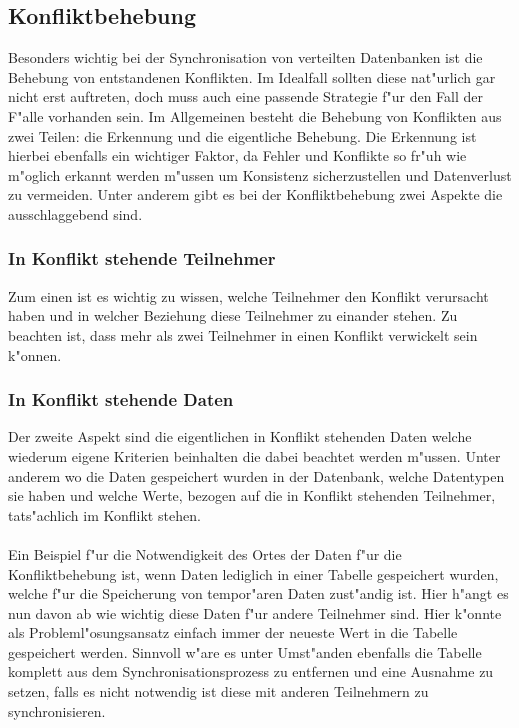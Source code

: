 \documentclass[a4paper,14pt]{scrreprt}
\begin{document}
\subsection{Konfliktbehebung}
Besonders wichtig bei der Synchronisation von verteilten Datenbanken ist die Behebung von entstandenen Konflikten. Im Idealfall sollten diese nat"urlich gar nicht erst auftreten, doch muss auch eine passende Strategie f"ur den Fall der F"alle vorhanden sein. Im Allgemeinen besteht die Behebung von Konflikten aus zwei Teilen: die Erkennung und die eigentliche Behebung. Die Erkennung ist hierbei ebenfalls ein wichtiger Faktor, da Fehler und Konflikte so fr"uh wie m"oglich erkannt werden m"ussen um Konsistenz sicherzustellen und Datenverlust zu vermeiden. Unter anderem gibt es bei der Konfliktbehebung zwei Aspekte die ausschlaggebend sind.
\subsubsection{In Konflikt stehende Teilnehmer}
Zum einen ist es wichtig zu wissen, welche Teilnehmer den Konflikt verursacht haben und in welcher Beziehung diese Teilnehmer zu einander stehen. Zu beachten ist, dass mehr als zwei Teilnehmer in einen Konflikt verwickelt sein k"onnen.
\subsubsection{In Konflikt stehende Daten}
Der zweite Aspekt sind die eigentlichen in Konflikt stehenden Daten welche wiederum eigene Kriterien beinhalten die dabei beachtet werden m"ussen. Unter anderem wo die Daten gespeichert wurden in der Datenbank, welche Datentypen sie haben und welche Werte, bezogen auf die in Konflikt stehenden Teilnehmer, tats"achlich im Konflikt stehen.\\\\Ein Beispiel f"ur die Notwendigkeit des Ortes der Daten f"ur die Konfliktbehebung ist, wenn Daten lediglich in einer Tabelle gespeichert wurden, welche f"ur die Speicherung von tempor"aren Daten zust"andig ist. Hier h"angt es nun davon ab wie wichtig diese Daten f"ur andere Teilnehmer sind. Hier k"onnte als Probleml"osungsansatz einfach immer der neueste Wert in die Tabelle gespeichert werden. Sinnvoll w"are es unter Umst"anden ebenfalls die Tabelle komplett aus dem Synchronisationsprozess zu entfernen und eine Ausnahme zu setzen, falls es nicht notwendig ist diese mit anderen Teilnehmern zu synchronisieren.
\end{document}
